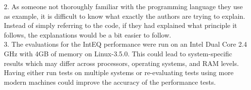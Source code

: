 \documentclass[12pt, a4paper]{article}
\begin{document}
	2. As someone not thoroughly familiar with the programming language they use as example, it is difficult to know what exactly the authors are trying to explain.  Instead of simply referring to the code, if they had explained what principle it follows, the explanations would be a bit easier to follow.\\

	3. The evaluations for the IntEQ performance were run on an Intel Dual Core 2.4 GHz with 4GB of memory on Linux-3.5.0.  This could lead to system-specific results which may differ across processors, operating systems, and RAM levels. Having either run tests on multiple systems or re-evaluating tests using more modern machines could improve the accuracy of the performance tests.\\ 
\end{document}
